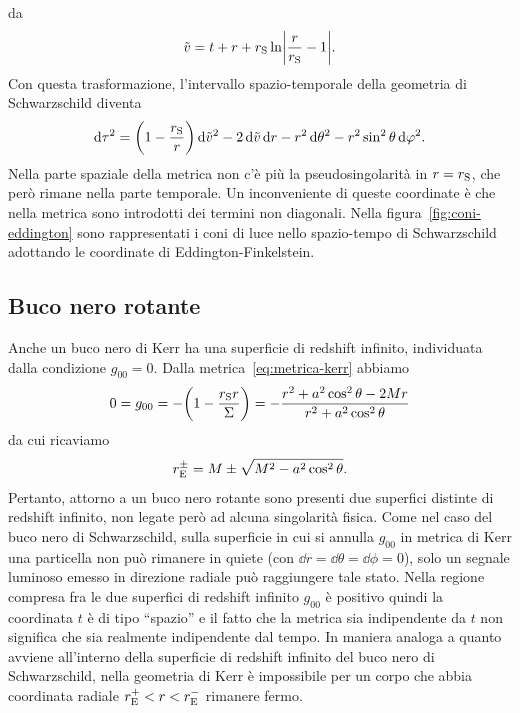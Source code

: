 da~\parencites{1924Natur.113..192E}{1958PhRv..110..965F}
\begin{equation}
  \tilde{v} = t + r + r_{\textup{S}} \ln\abs*{\frac{r}{r_{\textup{S}}} - 1}.
\end{equation}
Con questa trasformazione, l'intervallo spazio-temporale della geometria di
Schwarzschild diventa
\begin{equation}
  \mathop{}\!\mathrm{d}\tau^{2} = \biggl(1 - \frac{r_{\textup{S}}}{r}\biggr)\mathop{}\!\mathrm{d}\tilde{v}^{2} -
  2\mathop{}\!\mathrm{d}\tilde{v}\mathop{}\!\mathrm{d} r - r^{2}\mathop{}\!\mathrm{d}\theta^{2} - r^{2}\sin^{2}\theta\mathop{}\!\mathrm{d}\varphi^{2}.
\end{equation}
Nella parte spaziale della metrica non c'è più la pseudosingolarità in \(r =
r_{\textup{S}}\), che però rimane nella parte temporale.  Un inconveniente di
queste coordinate è che nella metrica sono introdotti dei termini non diagonali.
Nella figura~\ref{fig:coni-eddington} sono rappresentati i coni di luce nello
spazio-tempo di Schwarzschild adottando le coordinate di Eddington-Finkelstein.

\subsection{Buco nero rotante}
\label{sec:singolarita-kerr}

Anche un buco nero di Kerr ha una superficie di redshift infinito, individuata
dalla condizione \(g_{00} = 0\).  Dalla metrica~\eqref{eq:metrica-kerr} abbiamo
\begin{equation}
  0 = g_{00} = -\biggl(1 - \frac{r_{\textup{S}}r}{\Sigma}\biggr) = -\frac{r^{2}
    + a^{2}\cos^{2}\theta - 2 Mr}{r^{2} + a^{2}\cos^{2}\theta}
\end{equation}
da cui ricaviamo
\begin{equation}
  r_{\textup{E}}^{\pm} = M \pm \sqrt{M^{2} - a^{2}\cos^{2}\theta}.
\end{equation}
Pertanto, attorno a un buco nero rotante sono presenti due superfici distinte di
redshift infinito, non legate però ad alcuna singolarità fisica.  Come nel caso
del buco nero di Schwarzschild, sulla superficie in cui si annulla \(g_{00}\) in
metrica di Kerr una particella non può rimanere in quiete (con
\(\dd r = \dd\theta = \dd\phi = 0\)), solo un segnale luminoso emesso in
direzione radiale può raggiungere tale stato.  Nella regione compresa fra le due
superfici di redshift infinito \(g_{00}\) è positivo quindi la coordinata \(t\)
è di tipo ``spazio'' e il fatto che la metrica sia indipendente da \(t\) non
significa che sia realmente indipendente dal tempo.  In maniera analoga a quanto
avviene all'interno della superficie di redshift infinito del buco nero di
Schwarzschild, nella geometria di Kerr è impossibile per un corpo che abbia
coordinata radiale \(r_{\textup{E}}^{+} < r < r_{\textup{E}}^{-}\) rimanere
fermo.

